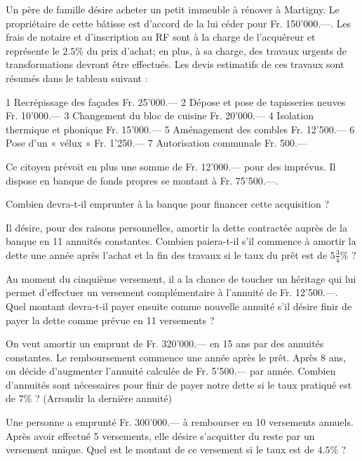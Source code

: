 \begin{exercice}
Un père de famille désire acheter un petit immeuble à rénover à Martigny. Le propriétaire de cette bâtisse est d’accord de la lui céder pour Fr. 150'000.—. Les frais de notaire et d’inscription au RF sont à la charge de l’acquéreur et représente le $2.5 \%$ du prix d’achat; en plus, à sa charge, des travaux urgents de transformations devront être effectués. Les devis estimatifs de ces travaux sont résumés dans le tableau suivant :


1	Recrépissage des façades	Fr.  25'000.––
2	Dépose et pose de tapisseries neuves	Fr.  10'000.––
3	Changement du bloc de cuisine	Fr.  20'000.––
4	Isolation thermique et phonique	Fr.  15'000.––
5	Aménagement des combles	Fr.  12'500.––
6	Pose d’un « vélux »	Fr.    1'250.––
7	Autorisation communale	Fr.       500.––


Ce citoyen prévoit en plus une somme de Fr. 12'000.— pour des imprévus. Il dispose en banque de fonds propres se montant à Fr. 75'500.—.

Combien devra-t-il emprunter à la banque pour financer cette acquisition ? 

Il désire, pour des raisons personnelles, amortir la dette contractée auprès de la banque en 11 annuités constantes. Combien paiera-t-il s’il commence à amortir la dette une année après l’achat et la fin des travaux si le taux du prêt est de $5\frac{3}{4} \%$ ?

Au moment du cinquième versement, il a la chance de toucher un héritage qui lui permet d’effectuer un versement complémentaire à l’annuité de Fr. 12'500.—.
Quel montant devra-t-il payer ensuite comme nouvelle annuité s’il désire finir de payer la dette comme prévue en 11 versements ?
\end{exercice}

\begin{exercice}
On veut amortir un emprunt de Fr. 320'000.— en 15 ans par des annuités constantes. Le remboursement commence une année après le prêt. Après 8 ans, on décide d’augmenter l’annuité calculée de Fr. 5'500.— par année. Combien d’annuités sont nécessaires pour finir de payer notre dette si le taux pratiqué est de $7 \%$ ? (Arrondir la dernière annuité)
\end{exercice}

\begin{exercice}
Une personne a emprunté Fr. 300'000.— à rembourser en 10 versements annuels. Après avoir effectué 5 versements, elle désire s’acquitter du reste par un versement unique. Quel est le montant de ce versement si le taux est de $4.5 \%$ ?
\end{exercice}

